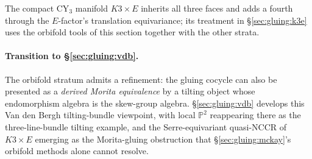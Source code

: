 The compact CY$_3$ manifold $K3 \times E$ inherits all three faces and adds a fourth through the $E$-factor's translation equivariance; its treatment in \S\ref{sec:gluing:k3e} uses the orbifold tools of this section together with the other strata.

\paragraph*{Transition to \S\ref{sec:gluing:vdb}.}
The orbifold stratum admits a refinement: the gluing cocycle can also be presented as a \emph{derived Morita equivalence} by a tilting object whose endomorphism algebra is the skew-group algebra. \S\ref{sec:gluing:vdb} develops this Van den Bergh tilting-bundle viewpoint, with local $\mathbb{P}^2$ reappearing there as the three-line-bundle tilting example, and the Serre-equivariant quasi-NCCR of $K3 \times E$ emerging as the Morita-gluing obstruction that \S\ref{sec:gluing:mckay}'s orbifold methods alone cannot resolve.
